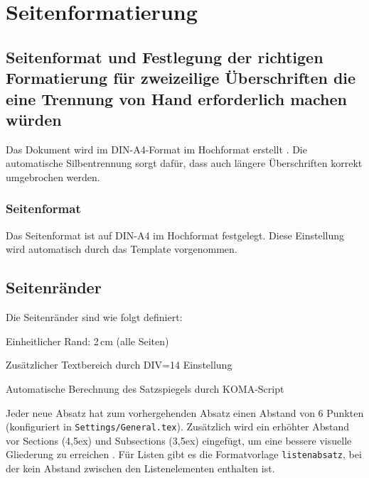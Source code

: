 
\chapter{Seitenformatierung}
\label{chap:seitenformatierung}

\section{Seitenformat und Festlegung der richtigen Formatierung für zweizeilige Überschriften die eine Trennung von Hand erforderlich machen würden}
\label{sec:seitenformat}

Das Dokument wird im DIN-A4-Format im Hochformat erstellt \parencite{hahner2011}. Die automatische Silbentrennung sorgt dafür, dass auch längere Überschriften korrekt umgebrochen werden.

\subsection*{Seitenformat}
\label{subsec:seitenformat_detail}

Das Seitenformat ist auf DIN-A4 im Hochformat festgelegt. Diese Einstellung wird automatisch durch das Template vorgenommen.

\section{Seitenränder}
\label{sec:seitenraender}

Die Seitenränder sind wie folgt definiert:
\begin{listenabsatz}
	\item Einheitlicher Rand: 2\,cm (alle Seiten)
	\item Zusätzlicher Textbereich durch DIV=14 Einstellung
	\item Automatische Berechnung des Satzspiegels durch KOMA-Script
\end{listenabsatz}

Jeder neue Absatz hat zum vorhergehenden Absatz einen Abstand von 6 Punkten (konfiguriert in \texttt{Settings/General.tex}). Zusätzlich wird ein erhöhter Abstand vor Sections (4,5ex) und Subsections (3,5ex) eingefügt, um eine bessere visuelle Gliederung zu erreichen \parencite{theisen2013}. Für Listen gibt es die Formatvorlage \texttt{listenabsatz}, bei der kein Abstand zwischen den Listenelementen enthalten ist.

